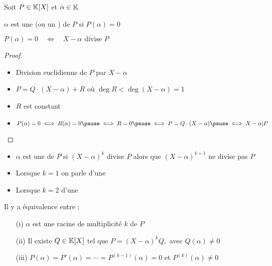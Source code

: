 \begin{frame}

Soit $P\in\mathbb{K}[X]$ et $\alpha\in\mathbb{K}$
\begin{mydefinition}
\centerline{$\alpha$ est une  (ou un ) de $P$ si $P(\alpha)=0$}
\end{mydefinition}

\bigskip
\pause


\begin{proposition}
\centerline{$P(\alpha)=0 \quad \iff \quad X-\alpha \text{ divise } P$}
\end{proposition}
\pause

\begin{proof}
\begin{itemize}
  \item Division euclidienne de $P$ par $X-\alpha$ 
\pause
  \item $P=Q\cdot(X-\alpha)+R$ \pause où $\deg R < \deg (X-\alpha) =1$
\pause
  \item $R$ est constant
\pause  
  \item $P(\alpha)=0 \iff R(\alpha) =0 \pause \iff R=0 \pause \iff P=Q\cdot(X-\alpha) \pause \iff X-\alpha | P$
\end{itemize}
\end{proof}
\end{frame}


\begin{frame}
\begin{mydefinition}
\begin{itemize}
  \item $\alpha$ est une 
 de $P$ si $(X-\alpha )^k$ divise $P$ alors que $(X- \alpha )^{k+1}$ ne divise pas $P$
\pause
  \item Lorsque $k=1$ on parle d'une 
\pause 
  \item Lorsque $k=2$ d'une 
\end{itemize}
\end{mydefinition}

\pause

\begin{proposition}
\label{prop:racmul}
Il y a équivalence entre :
\begin{itemize}
  \item[(i)] $\alpha$ est une racine de multiplicité $k$ de $P$
\pause
  \item[(ii)] Il existe  $Q \in\mathbb{K}[X]$ tel que $P=(X-\alpha)^kQ,$ avec $Q(\alpha) \neq 0$
\pause
  \item[(iii)] $P(\alpha)= P'(\alpha)=\cdots=P^{(k-1)}(\alpha)=0$ et $P^{(k)}(\alpha) \neq 0$
\end{itemize}
\end{proposition}

\end{frame}



